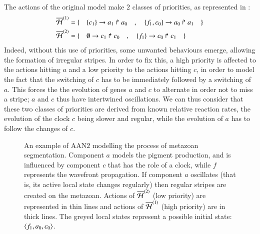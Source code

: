 The actions of the original model make $2$ classes of priorities, as represented in :
\begin{align*}
  \overline{\mathcal{H}}^{(1)} = \{ \quad
    & \{c_1\}\rightarrow a_1\Rsh a_0 \quad , \quad
    \{f_1, c_0\}\rightarrow a_0\Rsh a_1
  \quad \} \\
  \overline{\mathcal{H}}^{(2)} = \{ \quad
    & \emptyset\rightarrow c_1\Rsh c_0 \quad , \quad
    \{f_1\}\rightarrow c_0\Rsh c_1
  \quad \} \\
\end{align*}
Indeed, without this use of priorities,
some unwanted behaviours emerge, allowing the formation of irregular stripes.
In order to fix this, a high priority is affected to the actions hitting $a$
and a low priority to the actions hitting $c$,
in order to model the fact that the switching of $c$ has to be immediately followed by
a switching of $a$.
This forces the the evolution of genes $a$ and $c$
to alternate in order not to miss a stripe;
$a$ and $c$ thus have intertwined oscillations.
We can thus consider that these two classes of priorities
are derived from known relative reaction rates,
the evolution of the clock $c$ being slower and regular,
while the evolution of $a$ has to follow the changes of $c$.

\begin{figure}[p]
  \centering
  \caption{
  \label{fig:metazoan-php}
    An example of AAN$2$
    modelling the process of metazoan segmentation.
    Component $a$ models the pigment production, and is influenced by
    component $c$ that has the role of a clock,
    while $f$ represents the wavefront propagation.
    If component $a$ oscillates (that is, its active local state changes regularly)
    then regular stripes are created on the metazoan.
    Actions of $\overline{\mathcal{H}}^{(2)}$ (low priority) are represented in thin lines
    and actions of $\overline{\mathcal{H}}^{(1)}$ (high priority) are in thick lines.
    The greyed local states represent a possible initial state:
    $\mbox{$\langle f_1, a_0, c_0 \rangle$}$.
  }
\end{figure}

